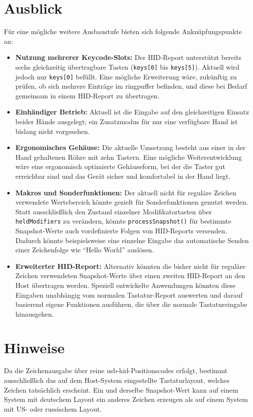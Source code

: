 \documentclass{article}
\begin{document}
\section{Ausblick}
\label{sec:ausblick}
Für eine mögliche weitere Ausbaustufe bieten sich folgende Anknüpfungspunkte an:

\begin{itemize}
    \item \textbf{Nutzung mehrerer Keycode-Slots:} Der HID-Report unterstützt bereits sechs gleichzeitig übertragbare Tasten (\texttt{keys[0]} bis \texttt{keys[5]}). Aktuell wird jedoch nur \texttt{keys[0]} befüllt. Eine mögliche Erweiterung wäre, zukünftig zu prüfen, ob sich mehrere Einträge im \gls{ringpuffer} befinden, und diese bei Bedarf gemeinsam in einem HID-Report zu übertragen.
    \item \textbf{Einhändiger Betrieb:} Aktuell ist die Eingabe auf den gleichzeitigen Einsatz beider Hände ausgelegt; ein Zusatzmodus für nur eine verfügbare Hand ist bislang nicht vorgesehen.
    \item \textbf{Ergonomisches Gehäuse:} Die aktuelle Umsetzung besteht aus einer in der Hand gehaltenen Röhre mit zehn Tastern. Eine mögliche Weiterentwicklung wäre eine ergonomisch optimierte Gehäuseform, bei der die Taster gut erreichbar sind und das Gerät sicher und komfortabel in der Hand liegt.
    \item \textbf{Makros und Sonderfunktionen:} Der aktuell nicht für reguläre Zeichen verwendete Wertebereich könnte gezielt für Sonderfunktionen genutzt werden. Statt ausschließlich den Zustand einzelner Modifikatortasten über \texttt{heldModifiers} zu verändern, könnte \texttt{processSnapshot()} für bestimmte Snapshot-Werte auch vordefinierte Folgen von HID-Reports versenden. Dadurch könnte beispielsweise eine einzelne Eingabe das automatische Senden einer Zeichenfolge wie \enquote{Hello World} auslösen.
    \item \textbf{Erweiterter HID-Report:} Alternativ könnten die bisher nicht für reguläre Zeichen verwendeten Snapshot-Werte über einen zweiten HID-Report an den Host übertragen werden. Speziell entwickelte Anwendungen könnten diese Eingaben unabhängig vom normalen Tastatur-Report auswerten und darauf basierend eigene Funktionen ausführen, die über die normale Tastatureingabe hinausgehen.
\end{itemize}

\section*{Hinweise}
Da die Zeichenausgabe über reine \gls{usb-hid}-Positionscodes erfolgt, bestimmt ausschließlich das auf dem Host-System eingestellte Tastaturlayout, welches Zeichen tatsächlich erscheint. Ein und derselbe Snapshot-Wert kann auf einem System mit deutschem Layout ein anderes Zeichen erzeugen als auf einem System mit US- oder russischem Layout.
\end{document}
